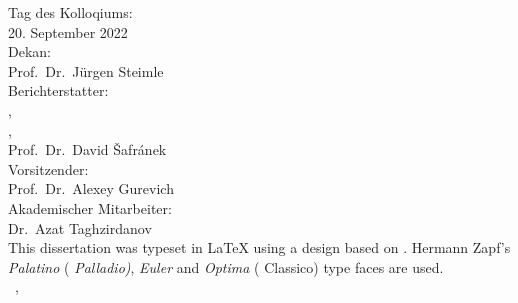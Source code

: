 \thispagestyle{empty}

\hfill
\vfill

{\raggedright
\noindent
Tag des Kolloqiums: \\
\hspace*{20pt}20. September 2022 \\
Dekan:\\
\hspace*{20pt}Prof.\ Dr.\ Jürgen Steimle\\
Berichterstatter:\\
\hspace*{20pt}\myProf,\\
\hspace*{20pt}\myOtherProf,\\
\hspace*{20pt}Prof.\ Dr.\ David Šafránek \\
Vorsitzender: \\
\hspace*{20pt}Prof.\ Dr.\ Alexey Gurevich\\
Akademischer Mitarbeiter:\\
\hspace{20pt}Dr.\ Azat Taghzirdanov\\
\bigskip
\noindent
This dissertation was typeset in \LaTeX{}  using a design based on \texttt{\classicthesis}.
Hermann Zapf's \emph{Palatino} (\emph{ Palladio)}, \emph{Euler} and \emph{Optima} ( Classico) type faces are used.\\
\bigskip
\noindent
\textcopyright\ \myName, \myTime
}
